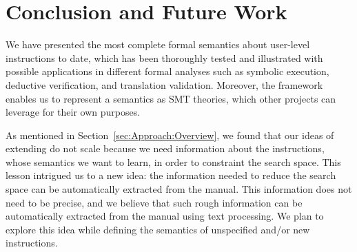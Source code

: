 \section{Conclusion and Future Work}\label{sec:conc}

We have presented the most complete formal semantics about \ISA user-level instructions
to date, which has been thoroughly tested and illustrated with possible applications in different formal analyses such as symbolic execution, deductive
verification, and translation validation.
Moreover, the \K framework enables us to represent a semantics as SMT theories,
which other projects can
leverage for their own purposes.

As mentioned in Section~\ref{sec:Approach:Overview}, we found that our ideas of extending \Strata do not scale because we need information about the instructions, whose semantics we want to learn, in order to constraint the search space. This lesson intrigued us to a new idea: the information needed to reduce the search space can be automatically extracted from the manual. This  information does not need to be precise, and we believe that such rough information can be automatically extracted from the manual using text processing.  We plan to explore this idea while defining the semantics of unspecified and/or new instructions.



 


   
